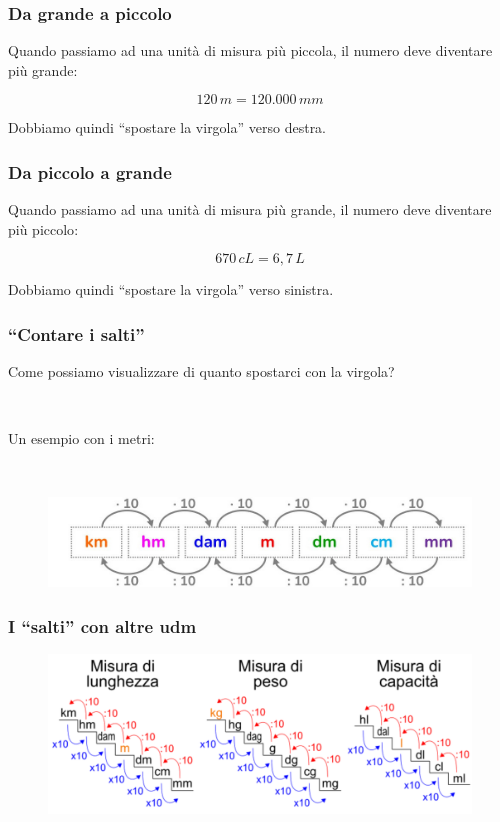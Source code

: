 \documentclass[handout]{beamer}
\theoremstyle{plain}
\begin{document}
\begin{frame}
\frametitle{Da grande a piccolo}
Quando passiamo ad una unità di misura \alert{più piccola}, il numero deve diventare \alert{più grande}:

\[ 120 \, m = 120.000 \, mm  \]\pause

Dobbiamo quindi ``spostare la virgola'' verso destra.
\end{frame}




\begin{frame}
\frametitle{Da piccolo a grande}
Quando passiamo ad una unità di misura \alert{più grande}, il numero deve diventare \alert{più piccolo}:

\[ 670 \, cL = 6,7 \, L  \]\pause

Dobbiamo quindi ``spostare la virgola'' verso sinistra.
\end{frame}



\begin{frame}
\frametitle{``Contare i salti''}
Come possiamo visualizzare \alert{di quanto} spostarci con la virgola?

~

Un esempio con i metri:

~

\begin{figure}
  \includegraphics[width=\columnwidth]{img/saltimetro.jpg}
\end{figure}
\end{frame}


\begin{frame}
\frametitle{I ``salti'' con altre udm}
\begin{figure}
  \includegraphics[width=\columnwidth]{img/saltiudm.png}
\end{figure}
\end{frame}
\end{document}
